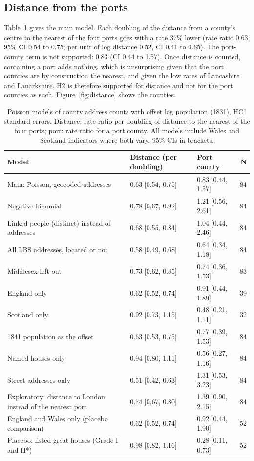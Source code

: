 \documentclass[11pt,a4paper]{article}
\begin{document}
\subsection{Distance from the ports}
Table~\ref{tab:models} gives the main model. Each doubling of the distance from a county's centre to the nearest of the four ports goes with a rate 37\% lower (rate ratio 0.63, 95\% CI 0.54 to 0.75; per unit of log distance 0.52, CI 0.41 to 0.65). The port-county term is not supported: 0.83 (CI 0.44 to 1.57). Once distance is counted, containing a port adds nothing, which is unsurprising given that the port counties are by construction the nearest, and given the low rates of Lancashire and Lanarkshire. H2 is therefore supported for distance and not for the port counties as such. Figure~\ref{fig:distance} shows the counties.

\begin{table}[tbp]\centering\footnotesize\caption{Poisson models of county address counts with offset log population (1831), HC1 standard errors. Distance: rate ratio per doubling of distance to the nearest of the four ports; port: rate ratio for a port county. All models include Wales and Scotland indicators where both vary. 95\% CIs in brackets.}\label{tab:models}\begin{tabular}{p{7.2cm}llr}\toprule Model & Distance (per doubling) & Port county & N\\\midrule
Main: Poisson, geocoded addresses & 0.63 [0.54, 0.75] & 0.83 [0.44, 1.57] & 84\\
Negative binomial & 0.78 [0.67, 0.92] & 1.21 [0.56, 2.61] & 84\\
Linked people (distinct) instead of addresses & 0.68 [0.55, 0.84] & 1.04 [0.44, 2.46] & 84\\
All LBS addresses, located or not & 0.58 [0.49, 0.68] & 0.64 [0.34, 1.18] & 84\\
Middlesex left out & 0.73 [0.62, 0.85] & 0.74 [0.36, 1.53] & 83\\
England only & 0.62 [0.52, 0.74] & 0.91 [0.44, 1.89] & 39\\
Scotland only & 0.92 [0.73, 1.15] & 0.48 [0.21, 1.11] & 32\\
1841 population as the offset & 0.63 [0.53, 0.75] & 0.77 [0.39, 1.53] & 84\\
Named houses only & 0.94 [0.80, 1.11] & 0.56 [0.27, 1.16] & 84\\
Street addresses only & 0.51 [0.42, 0.63] & 1.31 [0.53, 3.23] & 84\\
Exploratory: distance to London instead of the nearest port & 0.74 [0.67, 0.80] & 1.39 [0.90, 2.15] & 84\\
England and Wales only (placebo comparison) & 0.62 [0.52, 0.74] & 0.92 [0.44, 1.90] & 52\\
Placebo: listed great houses (Grade I and II*) & 0.98 [0.82, 1.16] & 0.28 [0.11, 0.73] & 52\\
\bottomrule\end{tabular}\end{table}
\end{document}
